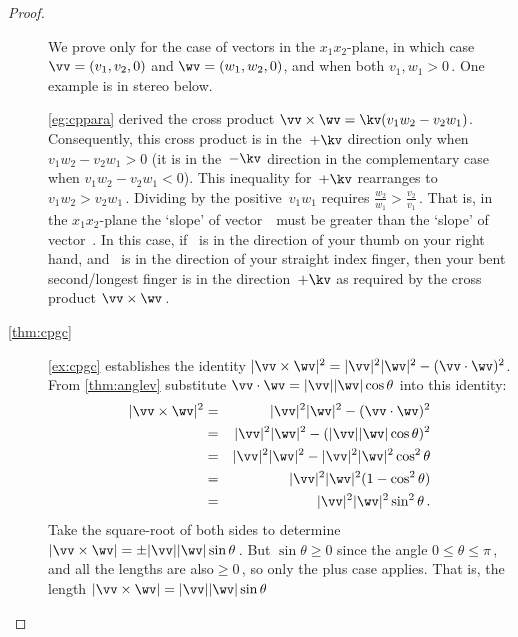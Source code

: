 \begin{proof}
\begin{description}
We prove only for the case of vectors in the \(x_1x_2\)-plane, in which case \(\vv=(v_1,v_2,0)\) and \(\wv=(w_1,w_2,0)\), and when both \(v_1,w_1>0\)\,.
One example is in stereo below.
\begin{center}
\end{center}
\cref{eg:cppara} derived the cross product \(\vv\times\wv=\kv(v_1w_2-v_2w_1)\).
Consequently, this cross product is in the~\(+\kv\) direction only when \(v_1w_2-v_2w_1>0\) (it is in the~\(-\kv\) direction in the complementary case when \(v_1w_2-v_2w_1<0\)). 
This inequality for~\(+\kv\) rearranges to \(v_1w_2>v_2w_1\)\,.
Dividing by the positive~\(v_1w_1\) requires \(\frac{w_2}{w_1}>\frac{v_2}{v_1}\)\,.
That is, in the \(x_1x_2\)-plane the `slope' of vector~\wv\ must be greater than the `slope' of vector~\vv.
In this case, if \vv~is in the direction of your thumb on your right hand, and \wv~is in the direction of your straight index finger, then your bent second\slash longest finger is in the direction~\(+\kv\) as required by the cross product \(\vv\times\wv\)\,.

\item[\ref{thm:cpgc}] \cref{ex:cpgc} establishes the identity \(|\vv\times\wv|^2=|\vv|^2|\wv|^2-(\vv\cdot\wv)^2\).
From \cref{thm:anglev} substitute \(\vv\cdot\wv=|\vv||\wv|\cos\theta\) into this identity:
\begin{eqnarray*}
|\vv\times\wv|^2&=&|\vv|^2|\wv|^2-(\vv\cdot\wv)^2
\\&=&|\vv|^2|\wv|^2-(|\vv||\wv|\cos\theta)^2
\\&=&|\vv|^2|\wv|^2-|\vv|^2|\wv|^2\cos^2\theta
\\&=&|\vv|^2|\wv|^2(1-\cos^2\theta)
\\&=&|\vv|^2|\wv|^2\sin^2\theta\,.
\end{eqnarray*}
Take the square-root of both sides to determine \(|\vv\times\wv|=\pm|\vv||\wv|\sin\theta\)\,.
But \(\sin\theta\geq0\) since the angle \(0\leq\theta\leq\pi\)\,, and all the lengths are also\({}\geq0\)\,, so only the plus case applies.
That is, the length \(|\vv\times\wv|=|\vv||\wv|\sin\theta\) 


\end{description}
\end{proof}
